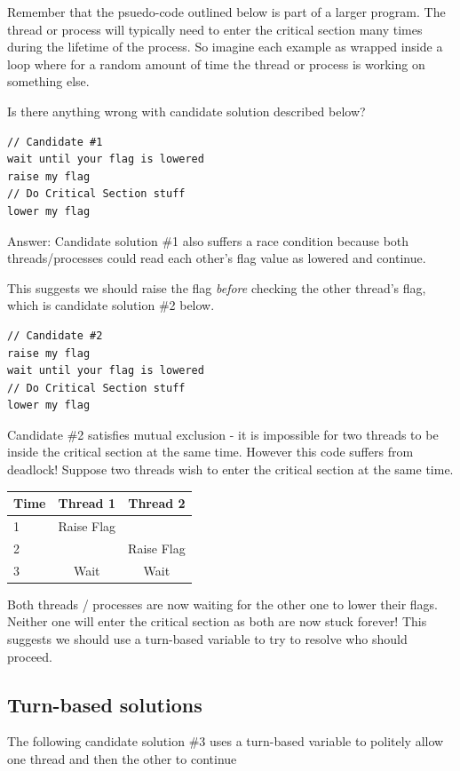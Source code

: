 Remember that the psuedo-code outlined below is part of a larger program.
The thread or process will typically need to enter the critical section many times during the lifetime of the process.
So imagine each example as wrapped inside a loop where for a random amount of time the thread or process is working on something else.

Is there anything wrong with candidate solution described below?

\begin{lstlisting}
// Candidate #1
wait until your flag is lowered
raise my flag
// Do Critical Section stuff
lower my flag
\end{lstlisting}

Answer: Candidate solution \#1 also suffers a race condition because both threads/processes could read each other's flag value as lowered and continue.

This suggests we should raise the flag \emph{before} checking the other thread's flag, which is candidate solution \#2 below.

\begin{lstlisting}
// Candidate #2
raise my flag
wait until your flag is lowered
// Do Critical Section stuff
lower my flag
\end{lstlisting}

Candidate \#2 satisfies mutual exclusion - it is impossible for two threads to be inside the critical section at the same time.
However this code suffers from deadlock!
Suppose two threads wish to enter the critical section at the same time.

\begin{tabular}{|l|c|c|}
Time & Thread 1 & Thread 2 \\ \hline
1 & Raise Flag & \\
2 & & Raise Flag \\
3 & Wait & Wait \\
\end{tabular}

Both threads / processes are now waiting for the other one to lower their flags.
Neither one will enter the critical section as both are now stuck forever!
This suggests we should use a turn-based variable to try to resolve who should proceed.

\subsection{Turn-based solutions}

The following candidate solution \#3 uses a turn-based variable to politely allow one thread and then the other to continue

